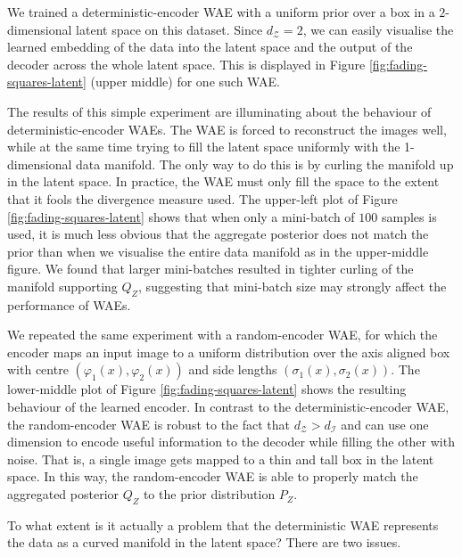 \documentclass{article}
\def\dZ{d_{\mathcal{Z}}}
\def\dP{d_{\mathcal{I}}}
\begin{document}
We trained a deterministic-encoder WAE with a uniform prior over a box in a $2$-dimensional latent space on this dataset.
Since $\dZ=2$, we can easily visualise the learned embedding of the data into the latent space and the output of the decoder across the whole latent space. This is displayed in Figure \ref{fig:fading-squares-latent} (upper middle) for one such WAE.


The results of this simple experiment are illuminating about the behaviour of deterministic-encoder WAEs. The WAE is forced to reconstruct the images well, while at the same time trying to fill the latent space uniformly with the 1-dimensional data manifold. The only way to do this is by curling the manifold up in the latent space. In practice, the WAE must only fill the space to the extent that it fools the divergence measure used. The upper-left plot of Figure \ref{fig:fading-squares-latent} shows that when only a mini-batch of $100$ samples is used, it is much less obvious that the aggregate posterior does not match the prior than when we visualise the entire data manifold as in the upper-middle figure.
We found that larger mini-batches resulted in tighter curling of the manifold supporting $Q_Z$, suggesting that mini-batch size may strongly affect the performance of WAEs.


We repeated the same experiment with a random-encoder WAE, for which the encoder maps an input image to a uniform distribution over the axis aligned box with centre $(\varphi_{1}(x),  \varphi_{2}(x))$ and side lengths $(\sigma_{1}(x), \sigma_{2}(x))$. 
The lower-middle plot of Figure \ref{fig:fading-squares-latent} shows the resulting behaviour of the learned encoder. In contrast to the deterministic-encoder WAE, the random-encoder WAE is robust to the fact that $\dZ > \dP$ and can use one dimension to encode useful information to the decoder while filling the other with noise. That is, a single image gets mapped to a thin and tall box in the latent space. In this way, the random-encoder WAE is able to properly match the aggregated posterior $Q_Z$ to the prior distribution $P_Z$.

To what extent is it actually a problem that the deterministic WAE represents the data as a curved manifold in the latent space? There are two issues.
\end{document}
